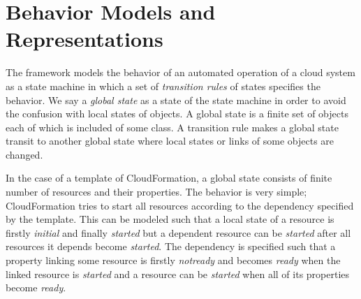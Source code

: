\documentclass[12pt]{report}
\begin{document}
\section{Behavior Models and Representations}
\label{sec:behaviormodel}
The framework models the behavior of an automated operation of a cloud
system as a state machine in which a set of {\it transition rules} of
states specifies the behavior. We say a {\it global state} as a state
of the state machine in order to avoid the confusion with local states
of objects. A global state is a finite set of objects each of which is
included of some class. A transition rule makes a global state transit
to another global state where local states or links of some objects
are changed.

In the case of a template of CloudFormation, a global state consists
of finite number of resources and their properties.  The behavior is
very simple; CloudFormation tries to start all resources according to
the dependency specified by the template.  This can be modeled such
that a local state of a resource is firstly {\it initial} and finally
{\it started} but a dependent resource can be {\it started} after all
resources it depends become {\it started}.  The dependency is
specified such that a property linking some resource is firstly {\it
  notready} and becomes {\it ready} when the linked resource is {\it
  started} and a resource can be {\it started} when all of its
properties become {\it ready}.
\end{document}
